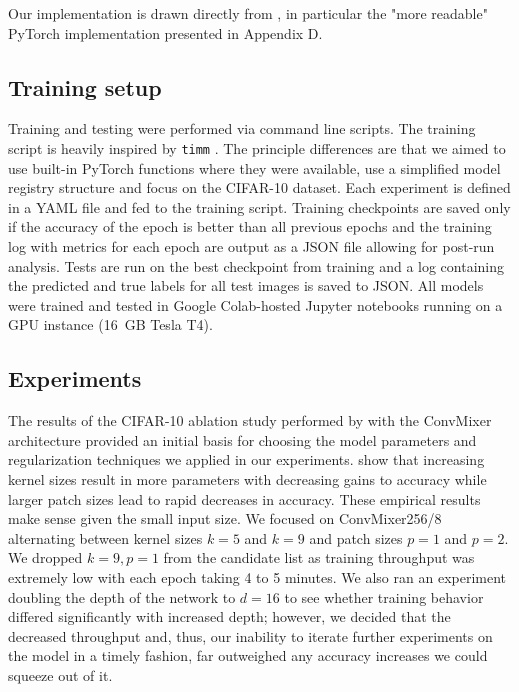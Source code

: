 \documentclass[letterpaper]{article} %
\begin{document}
Our implementation is drawn directly from \citet{trockman2022patches}, in particular the "more readable" PyTorch implementation presented in Appendix D. 

\subsection{Training setup}

Training and testing were performed via command line scripts. The training script is heavily inspired by \verb|timm| \citep{rw2019timm}. The principle differences are that we aimed to use built-in PyTorch functions where they were available, use a simplified model registry structure and focus on the CIFAR-10 dataset. Each experiment is defined in a YAML file and fed to the training script. Training checkpoints are saved only if the accuracy of the epoch is better than all previous epochs and the training log with metrics for each epoch are output as a JSON file allowing for post-run analysis. Tests are run on the best checkpoint from training and a log containing the predicted and true labels for all test images is saved to JSON. All models were trained and tested in Google Colab-hosted Jupyter notebooks running on a GPU instance (16 GB Tesla T4).

\subsection{Experiments}

The results of the CIFAR-10 ablation study performed by \citet{trockman2022patches} with the ConvMixer architecture provided an initial basis for choosing the model parameters and regularization techniques we applied in our experiments. \citet{trockman2022patches} show that increasing kernel sizes result in more parameters with decreasing gains to accuracy while larger patch sizes lead to rapid decreases in accuracy. These empirical results make sense given the small input size. We focused on ConvMixer256/8 alternating between kernel sizes $k=5$ and $k=9$ and patch sizes $p=1$ and $p=2$. We dropped $k=9, p=1$ from the candidate list as training throughput was extremely low with each epoch taking 4 to 5 minutes. We also ran an experiment doubling the depth of the network to $d=16$ to see whether training behavior differed significantly with increased depth; however, we decided that the decreased throughput and, thus, our inability to iterate further experiments on the model in a timely fashion, far outweighed any accuracy increases we could squeeze out of it.
\end{document}
